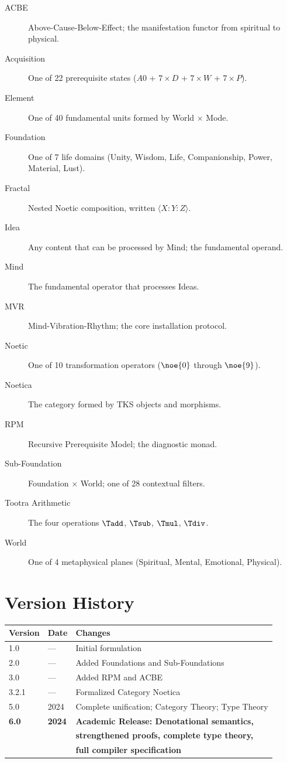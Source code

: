 \begin{description}
\item[ACBE] Above-Cause-Below-Effect; the manifestation functor from spiritual to physical.
\item[Acquisition] One of 22 prerequisite states ($A0$ + $7 \times D$ + $7 \times W$ + $7 \times P$).
\item[Element] One of 40 fundamental units formed by World $\times$ Mode.
\item[Foundation] One of 7 life domains (Unity, Wisdom, Life, Companionship, Power, Material, Lust).
\item[Fractal] Nested Noetic composition, written $\langle X : Y : Z \rangle$.
\item[Idea] Any content that can be processed by Mind; the fundamental operand.
\item[Mind] The fundamental operator that processes Ideas.
\item[MVR] Mind-Vibration-Rhythm; the core installation protocol.
\item[Noetic] One of 10 transformation operators ($\noe{0}$ through $\noe{9}$).
\item[Noetica] The category formed by TKS objects and morphisms.
\item[RPM] Recursive Prerequisite Model; the diagnostic monad.
\item[Sub-Foundation] Foundation $\times$ World; one of 28 contextual filters.
\item[Tootra Arithmetic] The four operations $\Tadd$, $\Tsub$, $\Tmul$, $\Tdiv$.
\item[World] One of 4 metaphysical planes (Spiritual, Mental, Emotional, Physical).
\end{description}

\chapter{Version History}
\label{app:version}

\begin{center}
\begin{tabular}{lll}
\toprule
\textbf{Version} & \textbf{Date} & \textbf{Changes} \\
\midrule
1.0 & --- & Initial formulation \\
2.0 & --- & Added Foundations and Sub-Foundations \\
3.0 & --- & Added RPM and ACBE \\
3.2.1 & --- & Formalized Category Noetica \\
5.0 & 2024 & Complete unification; Category Theory; Type Theory \\
\textbf{6.0} & \textbf{2024} & \textbf{Academic Release: Denotational semantics,} \\
 & & \textbf{strengthened proofs, complete type theory,} \\
 & & \textbf{full compiler specification} \\
\bottomrule
\end{tabular}
\end{center}

